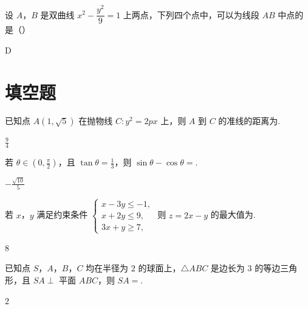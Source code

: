 \begin{problem}
设 \(A\)，\(B\) 是双曲线 \(x^2-\dfrac{y^2}{9}=1\) 上两点，下列四个点中，可以为线段 \(AB\) 中点的是（\quad）

\begin{answer}
D
\end{answer}
\end{problem}

\section{填空题}

\begin{problem}
已知点 \(A(1,\sqrt5)\) 在抛物线 \(C:y^2=2px\) 上，则 \(A\) 到 \(C\) 的准线的距离为\fillinblank{}.

\begin{answer}
\(\frac94\)
\end{answer}
\end{problem}

\begin{problem}
若 \(\theta\in\left(0,\frac\pi2\right)\)，且 \(\tan\theta=\frac13\)，则 \(\sin\theta-\cos\theta=\)\fillinblank{}.

\begin{answer}
\(-\frac{\sqrt{10}}{5}\)
\end{answer}
\end{problem}

\begin{problem}
若 \(x\)，\(y\) 满足约束条件 \(\begin{cases}
x-3y\le-1,\\
x+2y\le9,\\
3x+y\ge7,
\end{cases}\) 则 \(z=2x-y\) 的最大值为\fillinblank{}.

\begin{answer}
\(8\)
\end{answer}
\end{problem}

\begin{problem}
已知点 \(S\)，\(A\)，\(B\)，\(C\) 均在半径为 \(2\) 的球面上，\(\triangle ABC\) 是边长为 \(3\) 的等边三角形，且 \(SA\perp\) 平面 \(ABC\)，则 \(SA=\)\fillinblank{}.

\begin{answer}
\(2\)
\end{answer}
\end{problem}

